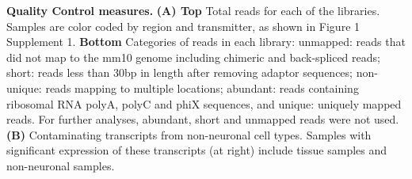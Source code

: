 \textbf{Quality Control measures.} \textbf{(A) Top} Total reads for each of the libraries. Samples are color coded by region and transmitter, as shown in Figure 1 Supplement 1.
\textbf {Bottom} Categories of reads in each library: unmapped: reads that did not map to the mm10 genome including chimeric and back-spliced reads; short: reads less than 30bp in length after removing adaptor sequences; non-unique: reads mapping to multiple locations; abundant: reads containing ribosomal RNA polyA, polyC and phiX sequences, and unique: uniquely mapped reads. For further analyses, abundant, short and unmapped reads were not used.
\textbf{(B)} Contaminating transcripts from non-neuronal cell types. Samples with significant expression of these transcripts (at right) include tissue samples and non-neuronal samples. 
